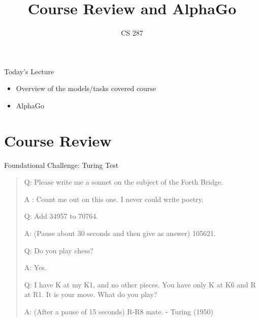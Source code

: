 \documentclass{beamer}
\title{Course Review and AlphaGo}
\date{}
\author{CS 287}
\begin{document}
\begin{frame}
  \titlepage
\end{frame}


\begin{frame}{Today's Lecture}
  \begin{itemize}
  \item Overview of the models/tasks covered course
    \air
    \air 
  \item AlphaGo 
  \end{itemize}
\end{frame}

\section{Course Review}

\begin{frame}{Foundational Challenge: Turing Test}
  \begin{quote}
    Q: Please write me a sonnet on the subject of the Forth Bridge.

    A : Count me out on this one. I never could write poetry.

    Q: Add 34957 to 70764.
    
    A: (Pause about 30 seconds and then give as answer) 105621.
    
    Q: Do you play chess?
    
    A: Yes.
    
    Q: I have K at my K1, and no other pieces. You have only K at K6 and R at R1. It is your move. What do you play?

    A: (After a pause of 15 seconds) R-R8 mate.
      {\normalfont - Turing (1950)}
  \end{quote}

\end{frame}
\end{document}
